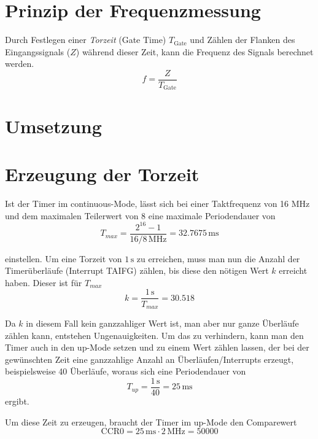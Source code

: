 \documentclass[a4paper, 12pt]{article}
\begin{document}
  
  \clearpage
  \setcounter{page}{1}
\section{Prinzip der Frequenzmessung}

Durch Festlegen einer \emph{Torzeit} (Gate Time) $T_{\textrm{Gate}}$ und Zählen der
Flanken des Eingangssignals ($Z$) während dieser Zeit, kann die Frequenz des Signals
berechnet werden.
\[f = \frac{Z}{T_{\textrm{Gate}}}\]

\section{Umsetzung}
\section{Erzeugung der Torzeit}
Ist der Timer im continuous-Mode, lässt sich bei einer Taktfrequenz von 16 MHz
und dem maximalen Teilerwert von 8 eine maximale Periodendauer von
\[T_{max} = \frac{2^{16}-1}{16/8 \,\si{\mega\hertz}} = 32.7675 \, \si{\milli\second}\]

einstellen. Um eine Torzeit von $1 \, \si{\second}$ zu erreichen, muss man nun
die Anzahl der Timerüberläufe (Interrupt TAIFG) zählen, bis diese den nötigen Wert $k$ erreicht haben.
Dieser ist für $T_{max}$
\[k = \frac{1 \, \si{\second}}{T_{max}} = 30.518\]

Da $k$ in diesem Fall kein ganzzahliger Wert ist, man aber nur ganze Überläufe
zählen kann, entstehen Ungenauigkeiten. Um das zu verhindern, kann man den Timer
auch in den up-Mode setzen und zu einem Wert zählen lassen, der bei der
gewünschten Zeit eine ganzzahlige Anzahl an Überläufen/Interrupts erzeugt,
beispielsweise 40 Überläufe, woraus sich eine Periodendauer von
\[T_{up} = \frac{1 \, \si{\second}}{40} = 25 \, \si{\milli\second}\]
ergibt.

Um diese Zeit zu erzeugen, braucht der Timer im up-Mode den Comparewert
\[\textrm{CCR0} = 25 \, \si{\milli\second} \cdot 2 \, \si{\mega\hertz} = 50000\]
\end{document}
